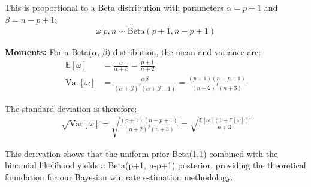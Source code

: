 \documentclass{article}
\begin{document}
This is proportional to a Beta distribution with parameters $\alpha = p + 1$ and $\beta = n - p + 1$:
\begin{align}
\omega | p, n \sim \text{Beta}(p + 1, n - p + 1)
\end{align}

\textbf{Moments:} For a Beta($\alpha$, $\beta$) distribution, the mean and variance are:
\begin{align}
\mathbb{E}[\omega] &= \frac{\alpha}{\alpha + \beta} = \frac{p + 1}{n + 2}\\
\text{Var}[\omega] &= \frac{\alpha\beta}{(\alpha + \beta)^2(\alpha + \beta + 1)} = \frac{(p+1)(n-p+1)}{(n+2)^2(n+3)}
\end{align}

The standard deviation is therefore:
\begin{align}
\sqrt{\text{Var}[\omega]} = \sqrt{\frac{(p+1)(n-p+1)}{(n+2)^2(n+3)}} = \sqrt{\frac{\mathbb{E}[\omega](1-\mathbb{E}[\omega])}{n+3}}
\end{align}

This derivation shows that the uniform prior Beta(1,1) combined with the binomial likelihood yields a Beta(p+1, n-p+1) posterior, providing the theoretical foundation for our Bayesian win rate estimation methodology.
\end{document}
